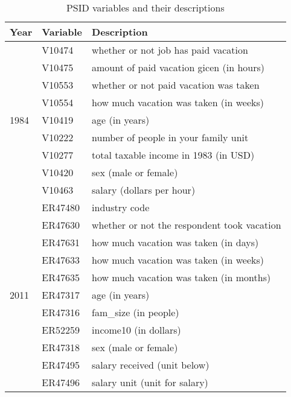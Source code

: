 \documentclass{article}
\begin{document}
    \setlength{\extrarowheight}{3pt}
    \begin{table}[h]
    \centering
    \hspace*{-1.5cm}
    \begin{tabular}{l|l|l}
        Year & Variable & Description \\ \hline \hline
      \multirow{9}{*}{1984}
        & V10474 & whether or not job has paid vacation      \\ \cline{2-3}
        & V10475 & amount of paid vacation gicen (in hours)  \\ \cline{2-3}
        & V10553 & whether or not paid vacation was taken    \\ \cline{2-3}
        & V10554 & how much vacation was taken (in weeks)    \\ \cline{2-3}
        & V10419 & age (in years)                            \\ \cline{2-3}
        & V10222 & number of people in your family unit      \\ \cline{2-3}
        & V10277 & total taxable income in 1983 (in USD)     \\ \cline{2-3}
        & V10420 & sex (male or female)                      \\ \cline{2-3}
        & V10463 & salary (dollars per hour)                 \\ \hline
      \multirow{12}{*}{2011}
        & ER47480 & industry code                               \\ \cline{2-3}
        & ER47630 & whether or not the respondent took vacation \\ \cline{2-3}
        & ER47631 & how much vacation was taken (in days)       \\ \cline{2-3}
        & ER47633 & how much vacation was taken (in weeks)      \\ \cline{2-3}
        & ER47635 & how much vacation was taken (in months)     \\ \cline{2-3}
        & ER47317 & age (in years)                              \\ \cline{2-3}
        & ER47316 & fam_size (in people)                        \\ \cline{2-3}
        & ER52259 & income10 (in dollars)                       \\ \cline{2-3}
        & ER47318 & sex (male or female)                        \\ \cline{2-3}
        & ER47495 & salary received (unit below)                \\ \cline{2-3}
        & ER47496 & salary unit (unit for salary)               \\ \hline
    \end{tabular}
    \hspace*{-1.5cm}
    \caption{PSID variables and their descriptions}
    \end{table}
\end{document}
